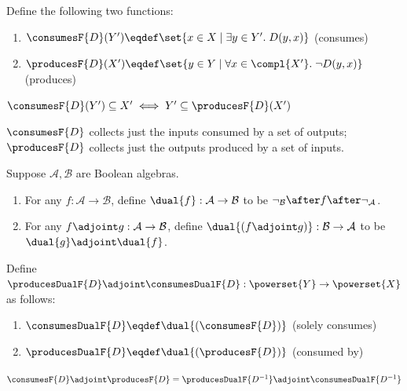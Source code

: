 \begin{definition}
   Define the following two functions:
   \begin{enumerate}
      \item $\consumesF{D}(Y') \eqdef \set{x \in X \mid \exists y \in Y'.\;D(y,x)}$ \hfill (consumes)
      \item $\producesF{D}(X') \eqdef \set{y \in Y \mid \forall x \in \compl{X'}.\;\neg D(y,x)}$ \hfill (produces)
   \end{enumerate}
\end{definition}

\begin{lemma}
   $\consumesF{D}(Y') \subseteq X' \iff Y' \subseteq \producesF{D}(X')$
\end{lemma}

\noindent $\consumesF{D}$ collects just the inputs consumed by a set of outputs; $\producesF{D}$ collects just the outputs produced by a set of inputs.

\begin{definition}
   Suppose $\mathcal{A}, \mathcal{B}$ are Boolean algebras.
   \begin{enumerate}
      \item For any $f: \mathcal{A} \to \mathcal{B}$, define $\dual{f}: \mathcal{A} \to \mathcal{B}$ to be $\neg_{\mathcal{B}} \after f \after \neg_{\mathcal{A}}$.
      \item For any $f \adjoint g: \mathcal{A} \to \mathcal{B}$, define $\dual{(f \adjoint g)}: \mathcal{B} \to \mathcal{A}$ to be $\dual{g} \adjoint \dual{f}$.
   \end{enumerate}
\end{definition}

\begin{definition} Define $\producesDualF{D} \adjoint \consumesDualF{D}: \powerset{Y} \to \powerset{X}$ as follows:
   \begin{enumerate}
      \item $\consumesDualF{D} \eqdef \dual{(\consumesF{D})}$ \hfill (solely consumes)
      \item $\producesDualF{D} \eqdef \dual{(\producesF{D})}$ \hfill (consumed by)
   \end{enumerate}
\end{definition}

\begin{lemma}
   $\consumesF{D} \adjoint \producesF{D} = \producesDualF{D^{-1}} \adjoint \consumesDualF{D^{-1}}$
\end{lemma}

